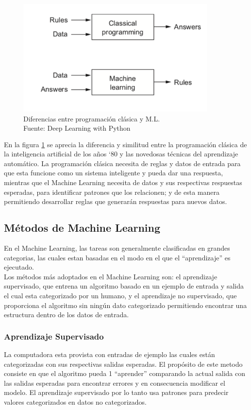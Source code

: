 \begin{figure}[H]
    \begin{center}
        \includegraphics[width=10cm]{img/capitulo_2/machinelearning.png}
    \end{center}
    \caption{Diferencias entre programación clásica y M.L.\\Fuente: Deep Learning with Python}
    \label{fig:classical_ml}
\end{figure}

En la figura \ref{fig:classical_ml} se aprecia la diferencia y similitud entre la programación clásica de la inteligencia artificial de los años `80 y las novedosas técnicas del aprendizaje automático. La programación clásica necesita de reglas y datos de entrada para que esta funcione como un sistema inteligente y pueda dar una respuesta, mientras que el Machine Learning necesita de datos y sus respectivas respuestas esperadas, para identificar patrones que los relacionen; y de esta manera permitiendo desarrollar reglas que generarán respuestas para nuevos datos.

\subsection{Métodos de Machine Learning}
En el Machine Learning, las tareas son generalmente clasificadas en grandes categorias, las cuales estan basadas en el modo en el que el ``aprendizaje'' es ejecutado.\\

Los métodos más adoptados en el Machine Learning son: el aprendizaje supervisado, que entrena un algoritmo basado en un ejemplo de entrada y salida el cual esta categorizado por un humano, y el aprendizaje no supervisado, que proporciona el algoritmo sin ningún dato categorizado permitiendo encontrar una estructura dentro de los datos de entrada.\

\subsubsection{Aprendizaje Supervisado}
La computadora esta provista con entradas de ejemplo las cuales están categorizadas con sus respectivas salidas esperadas. El propósito de este metodo consiste en que el algoritmo pueda 1 ``aprender'' comparando la actual salida con las salidas esperadas para encontrar errores y en consecuencia modificar el modelo. El aprendizaje supervisado por lo tanto usa patrones para predecir valores categorizados en datos no categorizados.\

